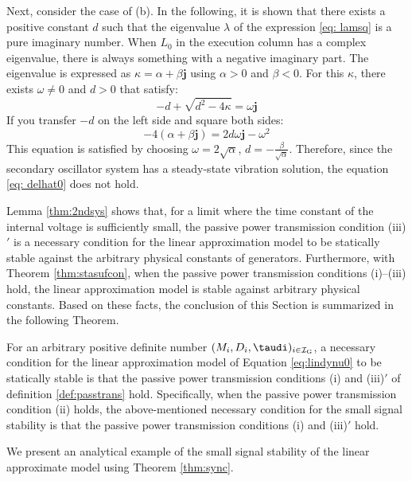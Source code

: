 \documentclass[tombow,dvipdfmx]{corona-a5-1.1}
\begin{document}
\begin{証明}
Next, consider the case of (b).
In the following, it is shown that there exists a positive constant $ d $ such that the eigenvalue $ \lambda $ of the expression \ref{eq: lamsq} is a pure imaginary number.
When $ L_0 $ in the execution column has a complex eigenvalue, there is always something with a negative imaginary part.
The eigenvalue is expressed as $ \kappa = \alpha + \beta \bm {j} $ using $ \alpha> 0 $ and $ \beta <0 $.
For this $ \kappa $, there exists $ \omega \neq 0 $ and $ d> 0 $ that satisfy: 
\[
-d + \sqrt{d^2-4\kappa}  = \omega \bm{j}
\]
If you transfer $ -d $ on the left side and square both sides:
\[
-4 (\alpha + \beta \bm{j}) = 2d \omega \bm{j} -\omega^2
\]
This equation is satisfied by choosing $ \omega = 2 \sqrt {\alpha} $, $ d =-\tfrac {\beta} {\sqrt {\alpha}} $.
Therefore, since the secondary oscillator system has a steady-state vibration solution, the equation \ref{eq: delhat0} does not hold.
\end{証明}


Lemma \ref{thm:2ndsys} shows that, for a limit where the time constant of the internal voltage is sufficiently small, the passive power transmission condition (iii)$'$ is a necessary condition for the linear approximation model to be statically stable against the arbitrary physical constants of generators.
Furthermore, with Theorem \ref{thm:stasufcon}, when the passive power transmission conditions (i)--(iii) hold, the linear approximation model is stable against arbitrary physical constants.
Based on these facts, the conclusion of this Section is summarized in the following Theorem.


\begin{定理}\label{thm:sync}
For an arbitrary positive definite number $(M_i,D_i,\taudi)_{i \in \mathcal{I}_{\rm G}}$, a necessary condition for the linear approximation model of Equation \ref{eq:lindynu0} to be statically stable is that the passive power transmission conditions (i) and (iii)$'$ of definition \ref{def:passtrans} hold.
Specifically, when the passive power transmission condition (ii) holds, the above-mentioned necessary condition for the small signal stability is that the passive power transmission conditions (i) and (iii)$'$ hold.
\end{定理}

We present an analytical example of the small signal stability of the linear approximate model using Theorem \ref{thm:sync}.
\end{document}
